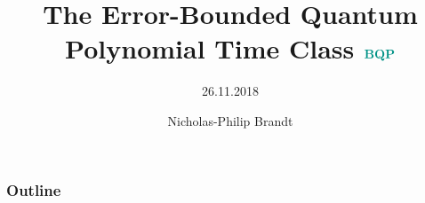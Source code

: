 \documentclass[18pt]{beamer}
\title[Short Title]{\LARGE The Error-Bounded Quantum\\Polynomial Time Class $\BQP$}
\subtitle{26.11.2018}
\author{Nicholas-Philip Brandt}
\institute[ITI]{Department of Informatics, Institute of Theoretical Informatics}
\begin{document}

\begin{frame}
	\titlepage
\end{frame}

\begin{frame}
	\frametitle{Outline}
	\tableofcontents
\end{frame}


\end{document}
